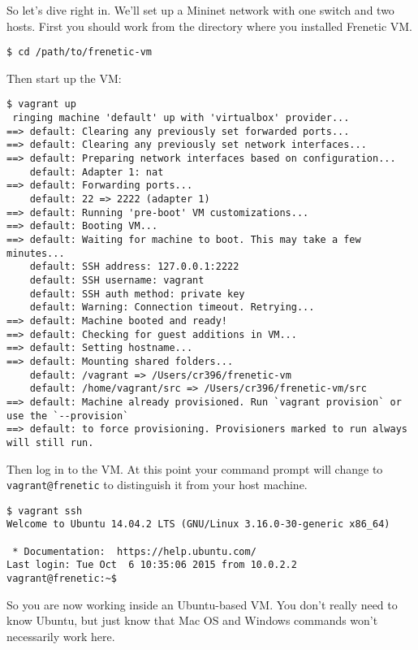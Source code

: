 So let's dive right in.  We'll set up a Mininet network with one switch and two hosts.  First you should work from the directory where you installed Frenetic VM.
\\
\begin{lstlisting}[style=BashInputStyle]
 $ cd /path/to/frenetic-vm
\end{lstlisting}
 
Then start up the VM:
\\
\begin{lstlisting}[style=BashInputStyle]
 $ vagrant up
 ringing machine 'default' up with 'virtualbox' provider...
==> default: Clearing any previously set forwarded ports...
==> default: Clearing any previously set network interfaces...
==> default: Preparing network interfaces based on configuration...
    default: Adapter 1: nat
==> default: Forwarding ports...
    default: 22 => 2222 (adapter 1)
==> default: Running 'pre-boot' VM customizations...
==> default: Booting VM...
==> default: Waiting for machine to boot. This may take a few minutes...
    default: SSH address: 127.0.0.1:2222
    default: SSH username: vagrant
    default: SSH auth method: private key
    default: Warning: Connection timeout. Retrying...
==> default: Machine booted and ready!
==> default: Checking for guest additions in VM...
==> default: Setting hostname...
==> default: Mounting shared folders...
    default: /vagrant => /Users/cr396/frenetic-vm
    default: /home/vagrant/src => /Users/cr396/frenetic-vm/src
==> default: Machine already provisioned. Run `vagrant provision` or use the `--provision`
==> default: to force provisioning. Provisioners marked to run always will still run.
\end{lstlisting}

Then log in to the VM.  At this point your command prompt will change to {\tt vagrant@frenetic} to distinguish it
from your host machine.
\\
\begin{lstlisting}[style=BashInputStyle]
 $ vagrant ssh
Welcome to Ubuntu 14.04.2 LTS (GNU/Linux 3.16.0-30-generic x86_64)

 * Documentation:  https://help.ubuntu.com/
Last login: Tue Oct  6 10:35:06 2015 from 10.0.2.2
vagrant@frenetic:~$ 
\end{lstlisting}

So you are now working inside an Ubuntu-based VM.  You don't really need to know Ubuntu, but just know that Mac OS and Windows commands won't necessarily work here.  

